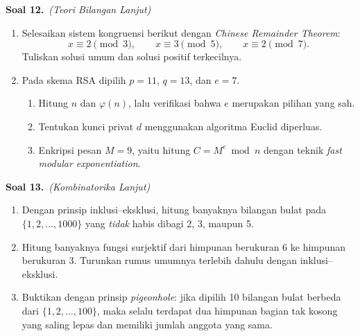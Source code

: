 \documentclass[11pt,a4paper]{article}
\newcommand{\soal}[2]{%
  \vspace{4pt}\noindent\textbf{Soal #1.}\ \textit{(#2)}\par\nobreak\vspace{2pt}}
\begin{document}
\soal{12}{Teori Bilangan Lanjut}
\begin{enumerate}[label=(\alph*),leftmargin=*]
  \item Selesaikan sistem kongruensi berikut dengan \emph{Chinese Remainder Theorem}:
  \[
  x \equiv 2 \pmod 3, \qquad x \equiv 3 \pmod 5, \qquad x \equiv 2 \pmod 7.
  \]
  Tuliskan solusi umum dan solusi positif terkecilnya.
  \item Pada skema RSA dipilih $p = 11$, $q = 13$, dan $e = 7$.
  \begin{enumerate}[label=(\roman*)]
    \item Hitung $n$ dan $\varphi(n)$, lalu verifikasi bahwa $e$ merupakan pilihan yang sah.
    \item Tentukan kunci privat $d$ menggunakan algoritma Euclid diperluas.
    \item Enkripsi pesan $M = 9$, yaitu hitung $C = M^{e} \bmod n$ dengan
          teknik \emph{fast modular exponentiation}.
  \end{enumerate}
\end{enumerate}

\soal{13}{Kombinatorika Lanjut}
\begin{enumerate}[label=(\alph*),leftmargin=*]
  \item Dengan prinsip inklusi--eksklusi, hitung banyaknya bilangan bulat pada
  $\{1,2,\dots,1000\}$ yang \emph{tidak} habis dibagi 2, 3, maupun 5.
  \item Hitung banyaknya fungsi surjektif dari himpunan berukuran 6 ke himpunan
  berukuran 3. Turunkan rumus umumnya terlebih dahulu dengan inklusi--eksklusi.
  \item Buktikan dengan prinsip \emph{pigeonhole}: jika dipilih 10 bilangan bulat
  berbeda dari $\{1,2,\dots,100\}$, maka selalu terdapat dua himpunan bagian tak
  kosong yang saling lepas dan memiliki jumlah anggota yang sama.
\end{enumerate}
\end{document}
